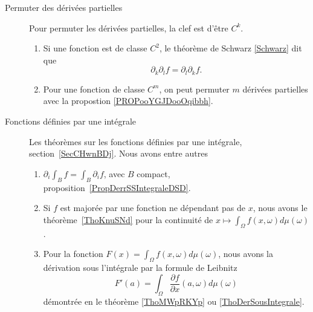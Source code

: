         \label{THEMEooJGEHooNzQkMT}
\begin{description}
	\item[Permuter des dérivées partielles]
		Pour permuter les dérivées partielles, la clef est d'être \( C^k\).
		\begin{enumerate}
			\item
			      Si une fonction est de classe \( C^2\), le théorème de Schwarz \ref{Schwarz} dit que
			      \begin{equation}
				      \partial_k\partial_lf=\partial_l\partial_kf.
			      \end{equation}
			\item
			      Pour une fonction de classe \( C^m\), on peut permuter \( m\) dérivées partielles avec la propostion \ref{PROPooYGJDooOqibbh}.
		\end{enumerate}
	\item[Fonctions définies par une intégrale]
		Les théorèmes sur les fonctions définies par une intégrale, section~\ref{SecCHwnBDj}. Nous avons entre autres
		\begin{enumerate}
			\item
			      \( \partial_i\int_Bf=\int_B\partial_if\), avec \( B\) compact, proposition~\ref{PropDerrSSIntegraleDSD}.
			\item
			      Si \( f\) est majorée par une fonction ne dépendant pas de \( x\), nous avons le théorème~\ref{ThoKnuSNd} pour la continuité de \( x\mapsto \int_{\Omega}f(x,\omega)d\mu(\omega)\).
			\item
			      Pour la fonction \( F(x)=\int_{\Omega}f(x,\omega)d\mu(\omega)\), nous avons la dérivation sous l'intégrale par la formule de Leibnitz
			      \begin{equation}
				      F'(a)=\int_{\Omega}\frac{ \partial f }{ \partial x }(a,\omega)d\mu(\omega)
			      \end{equation}
			      démontrée en le théorème \ref{ThoMWpRKYp} ou \ref{ThoDerSousIntegrale}.


\end{enumerate}
\end{description}
